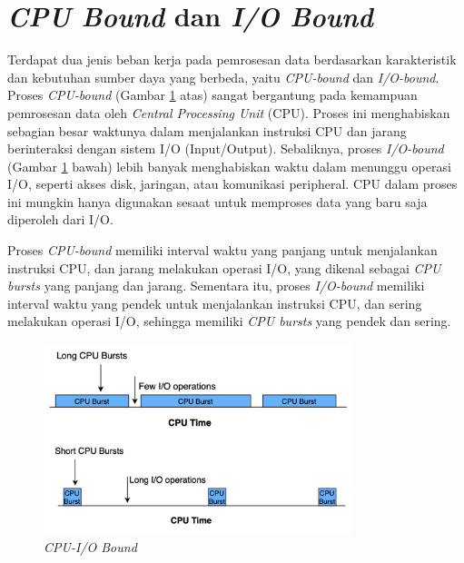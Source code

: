 \section{\textit{CPU Bound} dan \textit{I/O Bound}}

Terdapat dua jenis beban kerja pada pemrosesan data berdasarkan karakteristik dan kebutuhan sumber daya yang berbeda, yaitu \textit{CPU-bound} dan \textit{I/O-bound}. Proses \textit{CPU-bound} (Gambar \ref{fig:cpu-bound} atas) sangat bergantung pada kemampuan pemrosesan data oleh \textit{Central Processing Unit} (CPU). Proses ini menghabiskan sebagian besar waktunya dalam menjalankan instruksi CPU dan jarang berinteraksi dengan sistem I/O (Input/Output). Sebaliknya, proses \textit{I/O-bound} (Gambar \ref{fig:cpu-bound} bawah) lebih banyak menghabiskan waktu dalam menunggu operasi I/O, seperti akses disk, jaringan, atau komunikasi peripheral. CPU dalam proses ini mungkin hanya digunakan sesaat untuk memproses data yang baru saja diperoleh dari I/O. 

Proses \textit{CPU-bound} memiliki interval waktu yang panjang untuk menjalankan instruksi CPU, dan jarang melakukan operasi I/O, yang dikenal sebagai \textit{CPU bursts} yang panjang dan jarang. Sementara itu, proses \textit{I/O-bound} memiliki interval waktu yang pendek untuk menjalankan instruksi CPU, dan sering melakukan operasi I/O, sehingga memiliki \textit{CPU bursts} yang pendek dan sering. 

\begin{figure}[h!]
    \centering
    \includegraphics[width=0.8\textwidth]{figures/ch02/cpu-io-bound.jpg}
    \caption{\textit{CPU-I/O Bound} \cite{baeldungGuideCpuBoundBound2021}}
    \label{fig:cpu-bound}
\end{figure}


